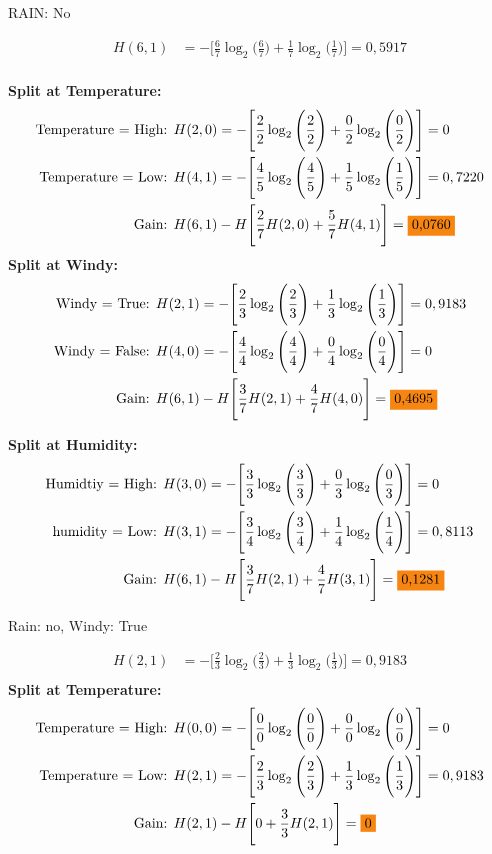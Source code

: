 \documentclass{article}
\begin{document}
RAIN: No

\begin{align*}
    H(6,1) &= -\Bigg[\frac{6}{7} \log_2\Bigg(\frac{6}{7}\Bigg) + \frac{1}{7} \log_2\Bigg(\frac{1}{7}\Bigg)\Bigg] = 0,5917\\
\end{align*}

\textbf{Split at Temperature:}
\begin{align*}
    \text{Temperature = High: } &H(2,0) = -\Bigg[\frac{2}{2} \log_2\Bigg(\frac{2}{2}\Bigg) + \frac{0}{2} \log_2\Bigg(\frac{0}{2}\Bigg)\Bigg] = 0\\
    \text{Temperature = Low: } &H(4,1) = -\Bigg[\frac{4}{5} \log_2\Bigg(\frac{4}{5}\Bigg) + \frac{1}{5} \log_2\Bigg(\frac{1}{5}\Bigg)\Bigg] = 0,7220\\
    \text{Gain: } &H(6,1) - H\Bigg[\frac{2}{7} H(2,0) + \frac{5}{7} H(4,1)\Bigg] = \text{\colorbox{BurntOrange}{0,0760}}
\end{align*}
\textbf{Split at Windy:}
\begin{align*}
    \text{Windy = True: } &H(2,1) = -\Bigg[\frac{2}{3} \log_2\Bigg(\frac{2}{3}\Bigg) + \frac{1}{3} \log_2\Bigg(\frac{1}{3}\Bigg)\Bigg] = 0,9183\\
    \text{Windy = False: } &H(4,0) = -\Bigg[\frac{4}{4} \log_2\Bigg(\frac{4}{4}\Bigg) + \frac{0}{4} \log_2\Bigg(\frac{0}{4}\Bigg)\Bigg] = 0\\
    \text{Gain: } &H(6,1) - H\Bigg[\frac{3}{7} H(2,1) + \frac{4}{7} H(4,0)\Bigg] = \text{\colorbox{BurntOrange}{0,4695}}
\end{align*}

\textbf{Split at Humidity:}
\begin{align*}
    \text{Humidtiy = High: } &H(3,0) = -\Bigg[\frac{3}{3} \log_2\Bigg(\frac{3}{3}\Bigg) + \frac{0}{3} \log_2\Bigg(\frac{0}{3}\Bigg)\Bigg] = 0\\
    \text{humidity = Low: } &H(3,1) = -\Bigg[\frac{3}{4} \log_2\Bigg(\frac{3}{4}\Bigg) + \frac{1}{4} \log_2\Bigg(\frac{1}{4}\Bigg)\Bigg] = 0,8113\\
    \text{Gain: } &H(6,1) - H\Bigg[\frac{3}{7} H(2,1) + \frac{4}{7} H(3,1)\Bigg] = \text{\colorbox{BurntOrange}{0,1281}}
\end{align*}

Rain: no, Windy: True 

\begin{align*}
    H(2,1) &= -\Bigg[\frac{2}{3} \log_2\Bigg(\frac{2}{3}\Bigg) + \frac{1}{3} \log_2\Bigg(\frac{1}{3}\Bigg)\Bigg] = 0,9183\\
\end{align*}
\textbf{Split at Temperature:}
\begin{align*}
    \text{Temperature = High: } &H(0,0) = -\Bigg[\frac{0}{0} \log_2\Bigg(\frac{0}{0}\Bigg) + \frac{0}{0} \log_2\Bigg(\frac{0}{0}\Bigg)\Bigg] = 0\\
    \text{Temperature = Low: } &H(2,1) = -\Bigg[\frac{2}{3} \log_2\Bigg(\frac{2}{3}\Bigg) + \frac{1}{3} \log_2\Bigg(\frac{1}{3}\Bigg)\Bigg] = 0,9183\\
    \text{Gain: } &H(2,1) - H\Bigg[0 + \frac{3}{3} H(2,1)\Bigg] = \text{\colorbox{BurntOrange}{0}}
\end{align*}
\end{document}
